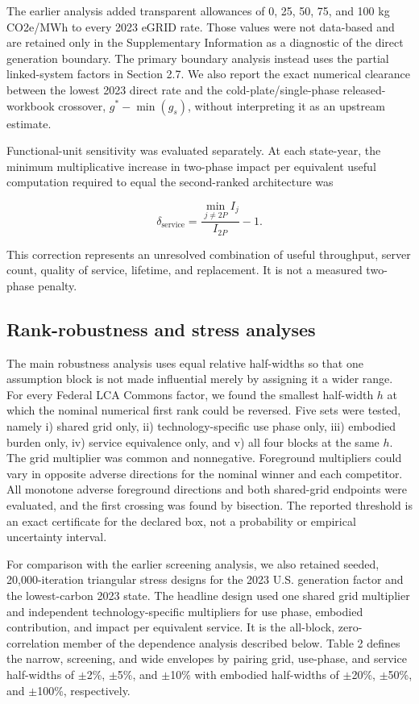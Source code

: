 \documentclass[review,12pt]{elsarticle}
\begin{document}
The earlier analysis added transparent allowances of 0, 25, 50, 75, and 100 kg CO2e/MWh to every 2023 eGRID rate. Those values were not data-based and are retained only in the Supplementary Information as a diagnostic of the direct generation boundary. The primary boundary analysis instead uses the partial linked-system factors in Section 2.7. We also report the exact numerical clearance between the lowest 2023 direct rate and the cold-plate/single-phase released-workbook crossover, $g^*-\min(g_s)$, without interpreting it as an upstream estimate.

Functional-unit sensitivity was evaluated separately. At each state-year, the minimum multiplicative increase in two-phase impact per equivalent useful computation required to equal the second-ranked architecture was

\[
\delta_{\mathrm{service}}=
\frac{\min_{j\ne 2P}I_j}{I_{2P}}-1.
\tag{11}
\]

This correction represents an unresolved combination of useful throughput, server count, quality of service, lifetime, and replacement. It is not a measured two-phase penalty.

\subsection{Rank-robustness and stress analyses}
The main robustness analysis uses equal relative half-widths so that one assumption block is not made influential merely by assigning it a wider range. For every Federal LCA Commons factor, we found the smallest half-width $h$ at which the nominal numerical first rank could be reversed. Five sets were tested, namely i) shared grid only, ii) technology-specific use phase only, iii) embodied burden only, iv) service equivalence only, and v) all four blocks at the same $h$. The grid multiplier was common and nonnegative. Foreground multipliers could vary in opposite adverse directions for the nominal winner and each competitor. All monotone adverse foreground directions and both shared-grid endpoints were evaluated, and the first crossing was found by bisection. The reported threshold is an exact certificate for the declared box, not a probability or empirical uncertainty interval.

For comparison with the earlier screening analysis, we also retained seeded, 20,000-iteration triangular stress designs for the 2023 U.S. generation factor and the lowest-carbon 2023 state. The headline design used one shared grid multiplier and independent technology-specific multipliers for use phase, embodied contribution, and impact per equivalent service. It is the all-block, zero-correlation member of the dependence analysis described below. Table 2 defines the narrow, screening, and wide envelopes by pairing grid, use-phase, and service half-widths of $\pm$2\%, $\pm$5\%, and $\pm$10\% with embodied half-widths of $\pm$20\%, $\pm$50\%, and $\pm$100\%, respectively.
\end{document}
